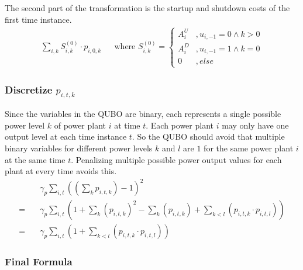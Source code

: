 The second part of the transformation is the startup and shutdown costs of the first time instance.
\begin{align}
  \sum_{i, k} S_{i, k}^{(0)} \cdot p_{i, 0, k}
  & & \text{where }
  S_{i, k}^{(0)} = \begin{cases}
    A_i^U & , u_{i, -1} = 0 \land k > 0 \\
    A_i^D & , u_{i, -1} = 1 \land k = 0 \\
    0 & , else
  \end{cases}
\end{align}

\subsubsection{Discretize $p_{i, t, k}$}

Since the variables in the QUBO are binary, each represents a single possible power level $k$ of power plant $i$ at time $t$.
Each power plant $i$ may only have one output level at each time instance $t$.
So the QUBO should avoid that multiple binary variables for different power levels $k$ and $l$ are $1$ for the same power plant $i$ at the same time $t$.
Penalizing multiple possible power output values for each plant at every time avoids this.
\begin{subequations}
\begin{align}
  & \gamma_p \sum_{i, t} \left( \left( \sum_k p_{i, t, k} \right) - 1 \right)^2
  \\ = \quad &
  \gamma_p \sum_{i, t} \left(
    1
    + \sum_k \left( p_{i, t, k} \right)^2
    - \sum_k \left( p_{i, t, k} \right)
    + \sum_{k < l} \left( p_{i, t, k} \cdot p_{i, t, l} \right)
  \right)
  \\ = \quad &
  \gamma_p \sum_{i, t} \left(
    1
    + \sum_{k < l} \left( p_{i, t, k} \cdot p_{i, t, l} \right)
  \right)
\end{align}
\end{subequations}

\subsubsection{Final Formula}

